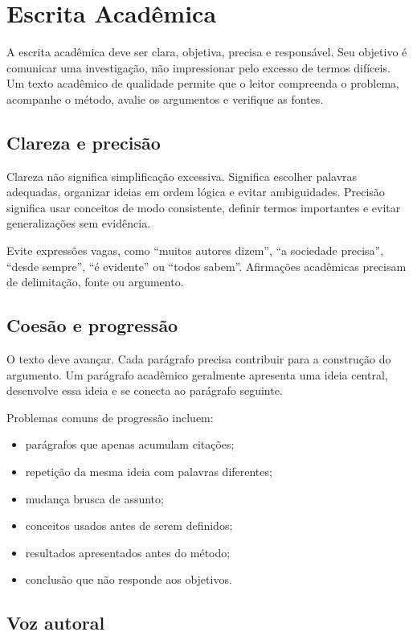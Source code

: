 \chapter{Escrita Acadêmica}

A escrita acadêmica deve ser clara, objetiva, precisa e responsável. Seu objetivo é comunicar uma investigação, não impressionar pelo excesso de termos difíceis. Um texto acadêmico de qualidade permite que o leitor compreenda o problema, acompanhe o método, avalie os argumentos e verifique as fontes.

\section{Clareza e precisão}

Clareza não significa simplificação excessiva. Significa escolher palavras adequadas, organizar ideias em ordem lógica e evitar ambiguidades. Precisão significa usar conceitos de modo consistente, definir termos importantes e evitar generalizações sem evidência.

Evite expressões vagas, como ``muitos autores dizem'', ``a sociedade precisa'', ``desde sempre'', ``é evidente'' ou ``todos sabem''. Afirmações acadêmicas precisam de delimitação, fonte ou argumento.

\section{Coesão e progressão}

O texto deve avançar. Cada parágrafo precisa contribuir para a construção do argumento. Um parágrafo acadêmico geralmente apresenta uma ideia central, desenvolve essa ideia e se conecta ao parágrafo seguinte.

Problemas comuns de progressão incluem:

\begin{itemize}
  \item parágrafos que apenas acumulam citações;
  \item repetição da mesma ideia com palavras diferentes;
  \item mudança brusca de assunto;
  \item conceitos usados antes de serem definidos;
  \item resultados apresentados antes do método;
  \item conclusão que não responde aos objetivos.
\end{itemize}

\section{Voz autoral}

